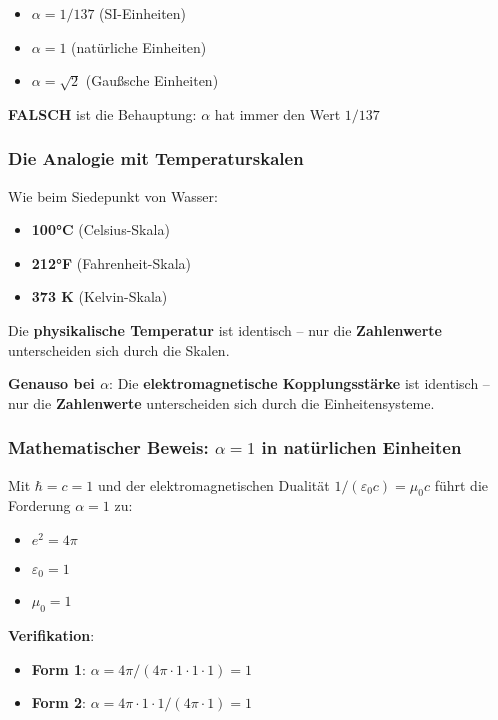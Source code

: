 \documentclass[12pt,a4paper]{report}
\begin{document}
	\begin{itemize}
		\item $\alpha = 1/137$ (SI-Einheiten)
		\item $\alpha = 1$ (natürliche Einheiten)
		\item $\alpha = \sqrt{2}$ (Gaußsche Einheiten)
	\end{itemize}
	
	\textbf{FALSCH} ist die Behauptung: $\alpha$ hat immer den Wert $1/137$
	
	\subsubsection{Die Analogie mit Temperaturskalen}
	
	Wie beim Siedepunkt von Wasser:
	\begin{itemize}
		\item \textbf{100°C} (Celsius-Skala)
		\item \textbf{212°F} (Fahrenheit-Skala)
		\item \textbf{373 K} (Kelvin-Skala)
	\end{itemize}
	
	Die \textbf{physikalische Temperatur} ist identisch -- nur die \textbf{Zahlenwerte} unterscheiden sich durch die Skalen.
	
	\textbf{Genauso bei $\alpha$}: Die \textbf{elektromagnetische Kopplungsstärke} ist identisch -- nur die \textbf{Zahlenwerte} unterscheiden sich durch die Einheitensysteme.
	
	\subsubsection{Mathematischer Beweis: $\alpha = 1$ in natürlichen Einheiten}
	
	Mit $\hbar = c = 1$ und der elektromagnetischen Dualität $1/(\varepsilon_0c) = \mu_0c$ führt die Forderung $\alpha = 1$ zu:
	
	\begin{itemize}
		\item $e^2 = 4\pi$
		\item $\varepsilon_0 = 1$
		\item $\mu_0 = 1$
	\end{itemize}
	
	\textbf{Verifikation}:
	\begin{itemize}
		\item \textbf{Form 1}: $\alpha = 4\pi/(4\pi \cdot 1 \cdot 1 \cdot 1) = 1$ \checkmark
		\item \textbf{Form 2}: $\alpha = 4\pi \cdot 1 \cdot 1/(4\pi \cdot 1) = 1$ \checkmark
	\end{itemize}
	
\end{document}
